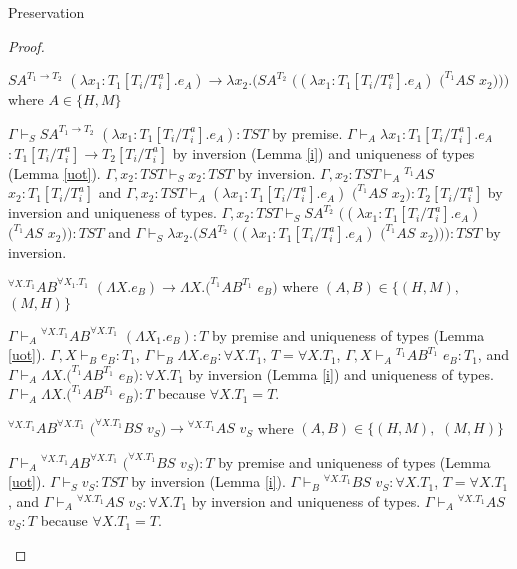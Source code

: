 \begin{theorem}{Preservation}
\begin{proof}

\begin{case}
$SA^{T_{1}\rightarrow T_{2}}$ $(\lambda x_{1}:T_{1}[T_{i}/T_{i}^{a}].e_{A})\rightarrow\lambda x_{2}.(SA^{T_{2}}$ $((\lambda x_{1}:T_{1}[T_{i}/T_{i}^{a}].e_{A})$ $(^{T_{1}}AS$ $x_{2})))$ where $A\in\lbrace H,M\rbrace$

$\Gamma\vdash_{S}SA^{T_{1}\rightarrow T_{2}}$ $(\lambda x_{1}:T_{1}[T_{i}/T_{i}^{a}].e_{A}):TST$ by premise.  $\Gamma\vdash_{A}\lambda x_{1}:T_{1}[T_{i}/T_{i}^{a}].e_{A}$ $:T_{1}[T_{i}/T_{i}^{a}]\rightarrow T_{2}[T_{i}/T_{i}^{a}]$ by inversion (Lemma \ref{i}) and uniqueness of types (Lemma \ref{uot}).  $\Gamma,x_{2}:TST\vdash_{S}x_{2}:TST$ by inversion.  $\Gamma,x_{2}:TST\vdash_{A}{^{T_{1}}A}S$ $x_{2}:T_{1}[T_{i}/T_{i}^{a}]$ and $\Gamma,x_{2}:TST\vdash_{A}(\lambda x_{1}:T_{1}[T_{i}/T_{i}^{a}].e_{A})$ $(^{T_{1}}AS$ $x_{2}):T_{2}[T_{i}/T_{i}^{a}]$ by inversion and uniqueness of types.  $\Gamma,x_{2}:TST\vdash_{S}SA^{T_{2}}$ $((\lambda x_{1}:T_{1}[T_{i}/T_{i}^{a}].e_{A})$ $(^{T_{1}}AS$ $x_{2})):TST$ and $\Gamma\vdash_{S}\lambda x_{2}.(SA^{T_{2}}$ $((\lambda x_{1}:T_{1}[T_{i}/T_{i}^{a}].e_{A})$ $(^{T_{1}}AS$ $x_{2}))):TST$ by inversion.
\end{case}


\begin{case}
$^{\forall X.T_{1}}AB^{\forall X_{1}.T_{1}}$ $(\Lambda X.e_{B})\rightarrow\Lambda X.(^{T_{1}}AB^{T_{1}}$ $e_{B})$ where $(A,B)\in\lbrace(H,M),$ $(M,H)\rbrace$

$\Gamma\vdash_{A}{^{\forall X.T_{1}}A}B^{\forall X.T_{1}}$ $(\Lambda X_{1}.e_{B}):T$ by premise and uniqueness of types (Lemma \ref{uot}).  $\Gamma,X\vdash_{B}e_{B}:T_{1}$, $\Gamma\vdash_{B}\Lambda X.e_{B}:\forall X.T_{1}$, $T=\forall X.T_{1}$, $\Gamma,X\vdash_{A}{^{T_{1}}A}B^{T_{1}}$ $e_{B}:T_{1}$, and $\Gamma\vdash_{A}\Lambda X.(^{T_{1}}AB^{T_{1}}$ $e_{B}):\forall X.T_{1}$ by inversion (Lemma \ref{i}) and uniqueness of types.  $\Gamma\vdash_{A}\Lambda X.(^{T_{1}}AB^{T_{1}}$ $e_{B}):T$ because $\forall X.T_{1}=T$.
\end{case}


\begin{case}
$^{\forall X.T_{1}}AB^{\forall X.T_{1}}$ $(^{\forall X.T_{1}}BS$ $v_{S})\rightarrow{^{\forall X.T_{1}}A}S$ $v_{S}$ where $(A,B)\in\lbrace(H,M),$ $(M,H)\rbrace$

$\Gamma\vdash_{A}{^{\forall X.T_{1}}A}B^{\forall X.T_{1}}$ $(^{\forall X.T_{1}}BS$ $v_{S}):T$ by premise and uniqueness of types (Lemma \ref{uot}).  $\Gamma\vdash_{S}v_{S}:TST$ by inversion (Lemma \ref{i}).  $\Gamma\vdash_{B}{^{\forall X.T_{1}}B}S$ $v_{S}:\forall X.T_{1}$, $T=\forall X.T_{1}$, and $\Gamma\vdash_{A}{^{\forall X.T_{1}}A}S$ $v_{S}:\forall X.T_{1}$ by inversion and uniqueness of types.  $\Gamma\vdash_{A}{^{\forall X.T_{1}}A}S$ $v_{S}:T$ because $\forall X.T_{1}=T$.
\end{case}


\end{proof}
\end{theorem}
